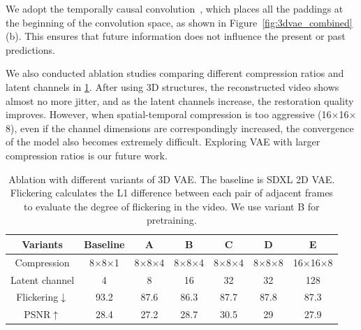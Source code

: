 
We adopt the temporally causal convolution~\citep{yu2023language}, which places all the paddings at the beginning of the convolution space, as shown in Figure~\ref{fig:3dvae_combined} (b). 
This ensures that future information does not influence the present or past predictions. 

We also conducted ablation studies comparing different compression ratios and latent channels in \cref{tab:vae1}.  After using 3D structures, the reconstructed video shows almost no more jitter, and as the latent channels increase, the restoration quality improves. However, when spatial-temporal compression is too aggressive (16$\times$16$\times$8), even if the channel dimensions are correspondingly increased, the convergence of the model also becomes extremely difficult. Exploring VAE with larger compression ratios is our future work. 

\begin{table}[]
    \centering
    
    \caption{Ablation with different variants of 3D VAE. The baseline is SDXL\citep{podell2023sdxl} 2D VAE. Flickering calculates the L1 difference between each pair of adjacent frames to evaluate the degree of flickering in the video. We use variant B for pretraining.}
    \begin{tabular}{c|cccccc}
    \toprule
        Variants & Baseline & A & B & C & D & E \\ \midrule
        Compression & 8$\times$8$\times$1&8$\times$8$\times$4 & 8$\times$8$\times$4 & 8$\times$8$\times$4 & 8$\times$8$\times$8 & 16$\times$16$\times$8 \\ 
        Latent channel &4 & 8 & 16 & 32 & 32 & 128 \\ 
        Flickering$\downarrow$&93.2 & 87.6 & 86.3 & 87.7 & 87.8 & 87.3 \\ 
        PSNR$\uparrow$&28.4 & 27.2 & 28.7 & 30.5 & 29 & 27.9 \\ \bottomrule
    \end{tabular}
    \label{tab:vae1}
\end{table}



